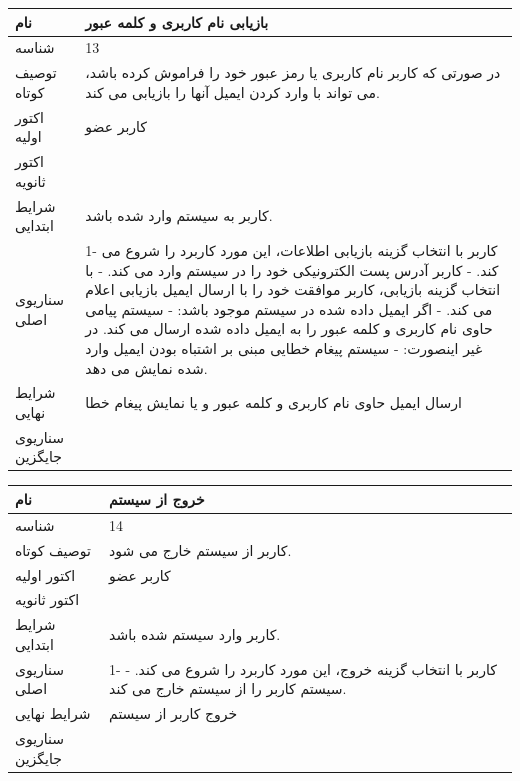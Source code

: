\begin{tabular}{|p{2cm}|p{10cm}|}
\hline
نام
&
بازیابی نام کاربری و کلمه عبور
\\
\hline
شناسه
&
13
\\
\hline
توصیف کوتاه
&
در صورتی که کاربر نام کاربری یا رمز عبور خود را فراموش کرده باشد،  می تواند با وارد کردن ایمیل آنها را بازیابی می کند.
\\
\hline
اکتور اولیه
&
کاربر عضو
\\
\hline
اکتور ثانویه
&

\\
\hline
شرایط ابتدایی
&
کاربر به سیستم وارد شده باشد.
\\
\hline
سناریوی اصلی
&
1- کاربر با انتخاب گزینه بازیابی اطلاعات، این مورد کاربرد را شروع می کند.
\newline
2- کاربر آدرس پست الکترونیکی خود را در سیستم وارد می کند.
\newline
3- با انتخاب گزینه بازیابی، کاربر موافقت خود را با ارسال ایمیل بازیابی اعلام می کند.
\newline
4- اگر ایمیل داده شده در سیستم موجود باشد:
\newline
4.1- سیستم پیامی حاوی نام کاربری و کلمه عبور را به ایمیل داده شده ارسال می کند.
\newline
در غیر اینصورت:
\newline
4.2- سیستم پیغام خطایی مبنی بر اشتباه بودن ایمیل وارد شده نمایش می دهد.
\\
\hline
شرایط نهایی
&
ارسال ایمیل حاوی نام کاربری و کلمه عبور و یا نمایش پیغام خطا
\\
\hline
سناریوی جایگزین
&

\\
\hline
\end{tabular}

\vspace{2cm}

\begin{tabular}{|p{2cm}|p{10cm}|}
\hline
نام
&
خروج از سیستم
\\
\hline
شناسه
&
14
\\
\hline
توصیف کوتاه
&
کاربر از سیستم خارج می شود.
\\
\hline
اکتور اولیه
&
کاربر عضو
\\
\hline
اکتور ثانویه
&

\\
\hline
شرایط ابتدایی
&
کاربر وارد سیستم شده باشد.
\\
\hline
سناریوی اصلی
&
1- کاربر با انتخاب گزینه خروج، این مورد کاربرد را شروع می کند.
\newline
2- سیستم کاربر را از سیستم خارج می کند.
\\
\hline
شرایط نهایی
&
خروج کاربر از سیستم
\\
\hline
سناریوی جایگزین
&

\\
\hline
\end{tabular}

